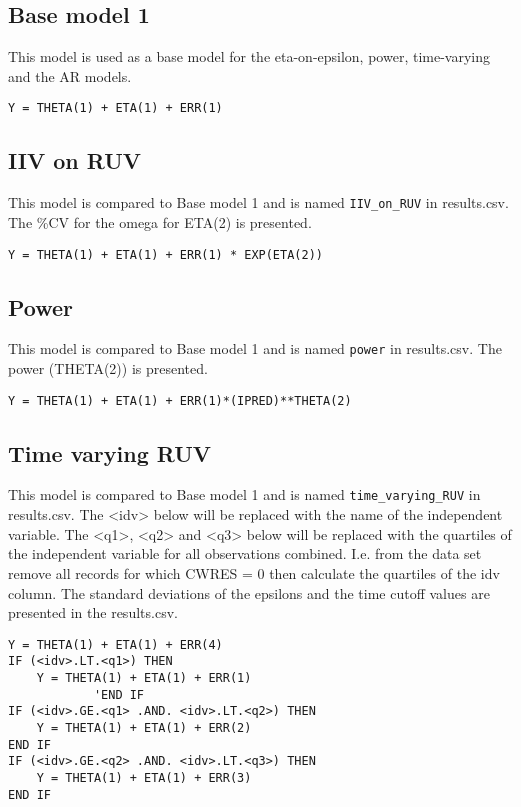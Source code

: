 \subsection{Base model 1}
This model is used as a base model for the eta-on-epsilon, power, time-varying and the AR models.

\begin{verbatim}
Y = THETA(1) + ETA(1) + ERR(1)
\end{verbatim}

\subsection{IIV on RUV}
This model is compared to Base model 1 and is named \verb|IIV_on_RUV| in results.csv. The \%CV for the omega for ETA(2) is presented.

\begin{verbatim}
Y = THETA(1) + ETA(1) + ERR(1) * EXP(ETA(2))
\end{verbatim}

\subsection{Power}
This model is compared to Base model 1 and is named \verb|power| in results.csv. The power (THETA(2)) is presented.

\begin{verbatim}
Y = THETA(1) + ETA(1) + ERR(1)*(IPRED)**THETA(2)
\end{verbatim}

\subsection{Time varying RUV}
This model is compared to Base model 1 and is named \verb|time_varying_RUV| in results.csv. The <idv> below will be replaced with the name of the independent variable. The <q1>, <q2> and <q3> below will be replaced with the quartiles of the independent variable
for all observations combined. I.e. from the data set remove all records for which CWRES = 0 then calculate the quartiles of the idv column. The standard deviations of the epsilons and the time cutoff values are presented in the results.csv.
\begin{verbatim}
Y = THETA(1) + ETA(1) + ERR(4)
IF (<idv>.LT.<q1>) THEN
    Y = THETA(1) + ETA(1) + ERR(1)
            'END IF
IF (<idv>.GE.<q1> .AND. <idv>.LT.<q2>) THEN
    Y = THETA(1) + ETA(1) + ERR(2)
END IF
IF (<idv>.GE.<q2> .AND. <idv>.LT.<q3>) THEN
    Y = THETA(1) + ETA(1) + ERR(3)
END IF
\end{verbatim}

